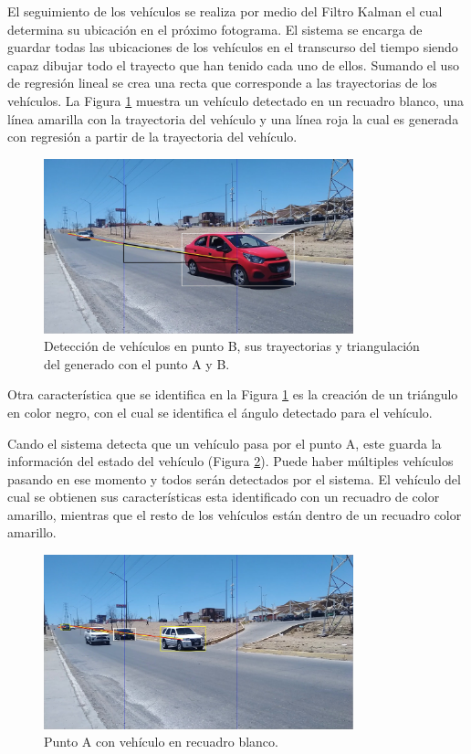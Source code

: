 El seguimiento de los vehículos se realiza por medio del Filtro Kalman el cual determina su ubicación en el próximo fotograma. El sistema se encarga de guardar todas las ubicaciones de los vehículos en el transcurso del tiempo siendo capaz dibujar todo el trayecto que han tenido cada uno de ellos. Sumando el uso de regresión lineal se crea una recta que corresponde a las trayectorias de los vehículos. La Figura \ref{fig:LugarSeguimiento} muestra un vehículo detectado en un recuadro blanco, una línea amarilla con la trayectoria del vehículo y una línea roja la cual es generada con regresión a partir de la trayectoria del vehículo.

\begin{figure}[H]
    \centering
    \includegraphics[width=0.8\textwidth]{Metodologia/imgs/Seguimiento_01.jpg}
    \caption{Detección de vehículos en punto B, sus trayectorias y triangulación del generado con el punto A y B.}
    \label{fig:LugarSeguimiento}
\end{figure}

Otra característica que se identifica en la Figura \ref{fig:LugarSeguimiento} es la creación de un triángulo en color negro, con el cual se identifica el ángulo detectado para el vehículo.

Cando el sistema detecta que un vehículo pasa por el punto A, este guarda la información del estado del vehículo (Figura \ref{fig:PuntoA}). Puede haber múltiples vehículos pasando en ese momento y todos serán detectados por el sistema. El vehículo del cual se obtienen sus características esta identificado con un recuadro de color amarillo, mientras que el resto de los vehículos están dentro de un recuadro color amarillo.


\begin{figure}[H]
    \centering
    \includegraphics[width=0.8\textwidth]{Metodologia/imgs/Punto_A.jpg}
    \caption{Punto A con vehículo en recuadro blanco.}
    \label{fig:PuntoA}
\end{figure}


